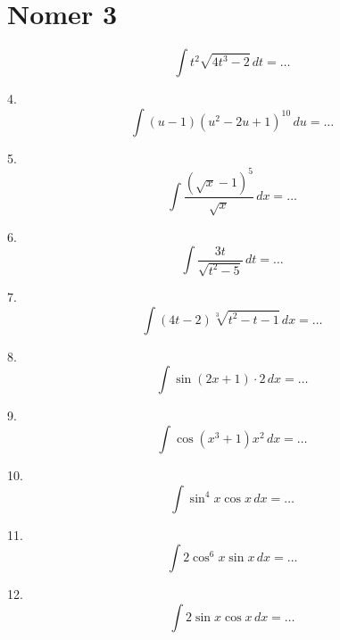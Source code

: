 \documentclass{article}
\begin{document}
\section{Nomer 3}
\[
\int t^2 \sqrt{4t^3 - 2} \, dt = \ldots
\]

4. \[
\int (u-1)\left(u^2 - 2u + 1\right)^{10} \, du = \ldots
\]

5. \[
\int \frac{(\sqrt{x} - 1)^5}{\sqrt{x}} \, dx = \ldots
\]

6. \[
\int \frac{3t}{\sqrt{t^2 - 5}} \, dt = \ldots
\]

7. \[
\int (4t - 2) \sqrt[3]{t^2 - t - 1} \, dx = \ldots
\]

8. \[
\int \sin(2x + 1) \cdot 2 \, dx = \ldots
\]

9. \[
\int \cos\left(x^3 + 1\right) x^2 \, dx = \ldots
\]

10. \[
\int \sin^4 x \cos x \, dx = \ldots
\]

11. \[
\int 2 \cos^6 x \sin x \, dx = \ldots
\]

12. \[
\int 2 \sin x \cos x \, dx = \ldots
\]
\end{document}
